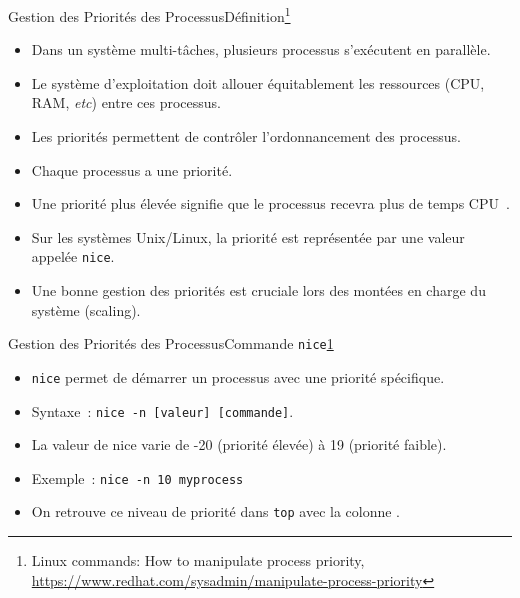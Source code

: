 \documentclass{beamer}
\begin{document}
    \begin{frame}{Gestion des Priorités des Processus}{Définition\footnote{\label{process-priority}Linux commands: How to manipulate process priority, \url{https://www.redhat.com/sysadmin/manipulate-process-priority}}}
        \begin{itemize}
            \item Dans un système multi-tâches, plusieurs processus s'exécutent en parallèle.
            \item Le système d'exploitation doit allouer équitablement les ressources (CPU, RAM, \textit{etc}) entre ces processus.
            \item Les priorités permettent de contrôler l'ordonnancement des processus.
            \item Chaque processus a une priorité.
            \item Une priorité plus élevée signifie que le processus recevra plus de temps CPU~.
            \item Sur les systèmes Unix/Linux, la priorité est représentée par une valeur appelée \lstinline{nice}.
            \item Une bonne gestion des priorités est cruciale lors des montées en charge du système (scaling).
        \end{itemize}
    \end{frame}

    \begin{frame}{Gestion des Priorités des Processus}{Commande \lstinline{nice}\cref{process-priority}}
        \begin{itemize}
            \item \lstinline{nice} permet de démarrer un processus avec une priorité spécifique.
            \item Syntaxe~: \lstinline{nice -n [valeur] [commande]}.
            \item La valeur de nice varie de -20 (priorité élevée) à 19 (priorité faible).
            \item Exemple~: \lstinline{nice -n 10 myprocess}
            \item On retrouve ce niveau de priorité dans \lstinline{top} avec la colonne .
        \end{itemize}
    \end{frame}
\end{document}
